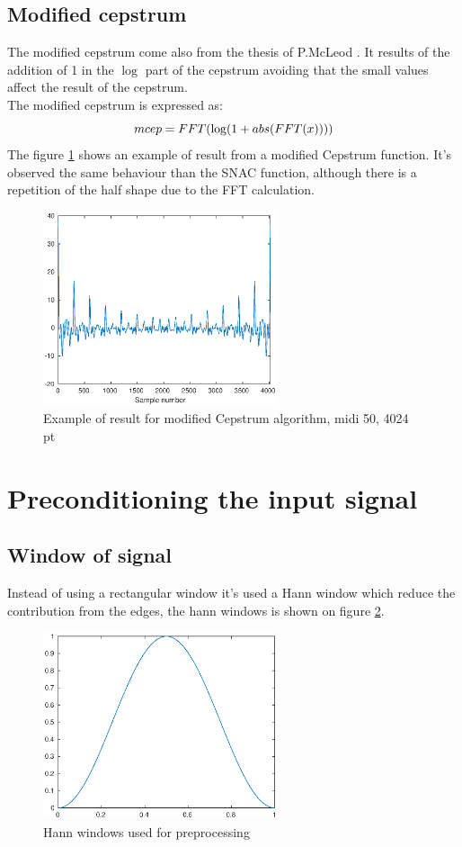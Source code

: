 \documentclass[twoside,twocolumn]{report}
\begin{document}
\subsection{Modified cepstrum}
The modified cepstrum come also from the thesis of P.McLeod \cite{mcleod2009fast}. It results of the addition of 1 in the $\log $ part of the cepstrum avoiding that the small values affect the result of the cepstrum.\\
The modified cepstrum is expressed as:
\begin{equation}
	mcep=\real{FFT(\log(1+abs(FFT(x))))}
\end{equation}
The figure \ref{Mcepalgo50} shows an example of result from a modified Cepstrum function. It's observed the same behaviour than the SNAC function, although there is a repetition of the half shape due to the FFT calculation.
\begin{figure}[h!]
	\centering
	\includegraphics[width=260px]{./images/Mcepstrum_functionR_4024pt_midi50.eps}
	\caption{Example of result for modified Cepstrum algorithm, midi 50, 4024 pt}
	\label{Mcepalgo50}
\end{figure}
\section{Preconditioning the input signal }
\subsection{Window of signal}
Instead of using a rectangular window it's used a Hann window which reduce the contribution from the edges, the hann windows is shown on figure \ref{hann}. 
\begin{figure}[h!]
	\centering
	\includegraphics[width=260px]{./images/hann4024.eps}
	\caption{Hann windows used for preprocessing}
	\label{hann}
\end{figure}
\end{document}
